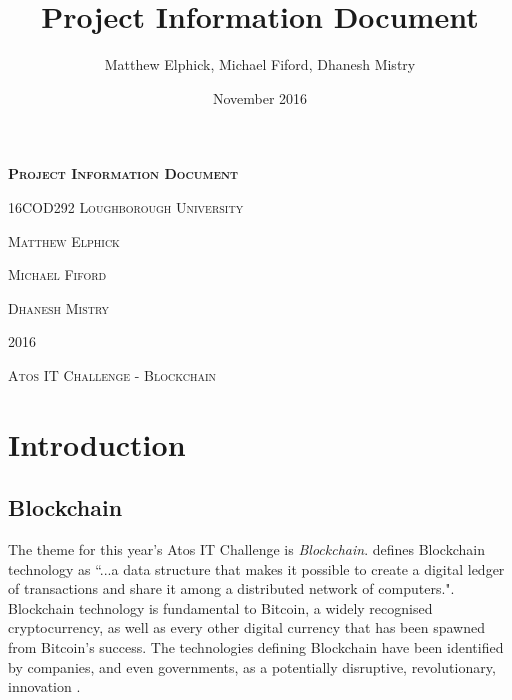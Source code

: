 \documentclass{article}
\title{Project Information Document}
\author{Matthew Elphick, Michael Fiford, Dhanesh Mistry}
\date{November 2016}
\begin{document}
\begin{titlepage}
\begin{center}
\textbf{\textsc{\Huge Project Information Document}}
\par
\vspace{0.5cm}
\textsc{\huge 16COD292}
\vfill
\textsc{\Huge Loughborough University}
\vspace{1cm}
\par
\textsc{\huge Matthew Elphick}
\par
\vspace{0.2cm}
\textsc{\huge Michael Fiford}
\par
\vspace{0.2cm}
\textsc{\huge Dhanesh Mistry}
\vspace{1cm}
\par
\textsc{\Huge 2016}
\end{center}
\end{titlepage}

\maketitle

\tableofcontents
\newpage

\begin{spacing}{2}
    \begin{center}
        \textsc{\huge{Atos IT Challenge - Blockchain}}
    \end{center}
\end{spacing}

\section{Introduction}


\subsection{Blockchain}

The theme for this year's Atos IT Challenge is \emph{Blockchain}. \textcite{cioblockchain} defines Blockchain technology as ``...a data structure that makes it possible to create a digital ledger of transactions and share it among a distributed network of computers.". Blockchain technology is fundamental to Bitcoin, a widely recognised cryptocurrency, as well as every other digital currency that has been spawned from Bitcoin's success. The technologies defining Blockchain have been identified by companies, and even governments, as a potentially disruptive, revolutionary, innovation \parencite{ukdlt} \parencite{nomura_research_institute_survey_2016}.
\end{document}
